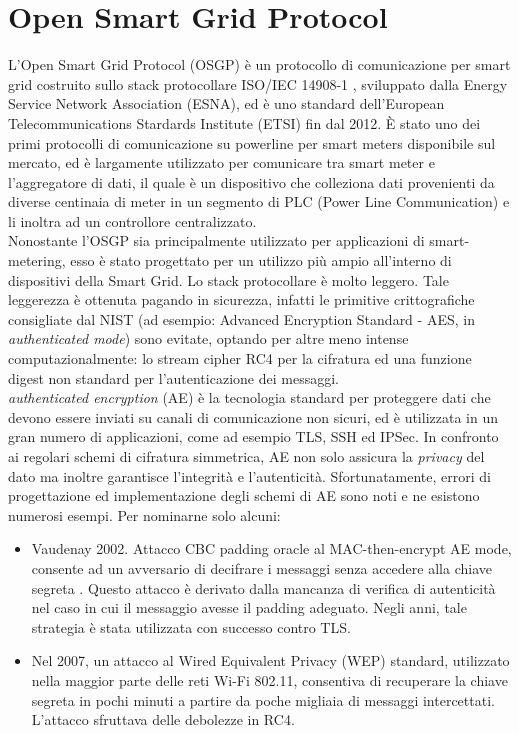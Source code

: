 \section{Open Smart Grid Protocol \label{sez:OSGP}}
L'Open Smart Grid Protocol (OSGP) \cite{osgp} è un protocollo di comunicazione per smart grid costruito sullo stack protocollare ISO/IEC 14908-1 \cite{standard14908}, sviluppato dalla Energy Service Network Association (ESNA), ed è uno standard dell'European Telecommunications Stardards Institute (ETSI) fin dal 2012. È stato uno dei primi protocolli di comunicazione su powerline per smart meters disponibile sul mercato, ed è largamente utilizzato per comunicare tra smart meter e l'aggregatore di dati, il quale è un dispositivo che colleziona dati provenienti da diverse centinaia di meter in un segmento di PLC (Power Line Communication) e li inoltra ad un controllore centralizzato.\\
Nonostante l'OSGP sia principalmente utilizzato per applicazioni di smart-metering, esso è stato progettato per un utilizzo più ampio all'interno di dispositivi della Smart Grid. Lo stack protocollare è molto leggero. Tale leggerezza è ottenuta pagando in sicurezza, infatti le primitive crittografiche consigliate dal NIST  (ad esempio: Advanced Encryption Standard - AES, in \emph{authenticated mode}) sono evitate, optando per altre meno intense computazionalmente: lo stream cipher RC4 per la cifratura ed una funzione digest non standard per l'autenticazione dei messaggi.\\
\emph{authenticated encryption} (AE) è la tecnologia standard per proteggere dati che devono essere inviati su canali di comunicazione non sicuri, ed è utilizzata in un gran numero di applicazioni, come ad esempio TLS, SSH ed IPSec. In confronto ai regolari schemi di cifratura simmetrica, AE non solo assicura la \emph{privacy} del dato ma inoltre garantisce l'integrità e l'autenticità. Sfortunatamente, errori di progettazione ed implementazione degli schemi di AE sono noti e ne esistono numerosi esempi. Per nominarne solo alcuni:
\begin{itemize}
	\item Vaudenay 2002. Attacco CBC padding oracle al MAC-then-encrypt AE mode, consente ad un avversario di decifrare i messaggi senza accedere alla chiave segreta \cite{cbcpadding}. Questo attacco è derivato dalla mancanza di verifica di autenticità nel caso in cui il messaggio avesse il padding adeguato. Negli anni, tale strategia è stata utilizzata con successo contro TLS.
	\item Nel 2007, un attacco \cite{wep2} al Wired Equivalent Privacy (WEP) standard, utilizzato nella maggior parte delle reti Wi-Fi 802.11, consentiva di recuperare la chiave segreta in pochi minuti a partire da poche migliaia di messaggi intercettati. L'attacco sfruttava delle debolezze in RC4.
\end{itemize}
